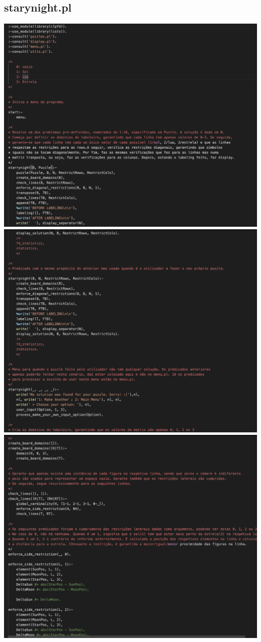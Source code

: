 \documentclass[a4paper]{article}
\begin{document}
\subsection{starynight.pl}
\begin{center}
    \includegraphics[scale=0.4]{img/8.png}
    \includegraphics[scale=0.4]{img/9.png}
    \includegraphics[scale=0.4]{img/10.png}

\end{center}
\end{document}
